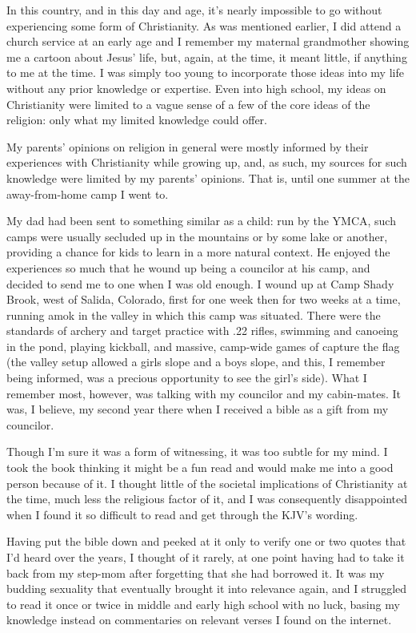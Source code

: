 \documentclass{book}
\begin{document}
In this country, and in this day and age, it's nearly impossible to go without experiencing some form of Christianity.  As was mentioned earlier, I did attend a church service at an early age and I remember my maternal grandmother showing me a cartoon about Jesus' life, but, again, at the time, it meant little, if anything to me at the time.  I was simply too young to incorporate those ideas into my life without any prior knowledge or expertise.  Even into high school, my ideas on Christianity were limited to a vague sense of a few of the core ideas of the religion: only what my limited knowledge could offer.

My parents' opinions on religion in general were mostly informed by their experiences with Christianity while growing up, and, as such, my sources for such knowledge were limited by my parents' opinions.  That is, until one summer at the away-from-home camp I went to.

My dad had been sent to something similar as a child: run by the YMCA, such camps were usually secluded up in the mountains or by some lake or another, providing a chance for kids to learn in a more natural context.  He enjoyed the experiences so much that he wound up being a councilor at his camp, and decided to send me to one when I was old enough.  I wound up at Camp Shady Brook, west of Salida, Colorado, first for one week then for two weeks at a time, running amok in the valley in which this camp was situated.  There were the standards of archery and target practice with .22 rifles, swimming and canoeing in the pond, playing kickball, and massive, camp-wide games of capture the flag (the valley setup allowed a girls slope and a boys slope, and this, I remember being informed, was a precious opportunity to see the girl's side).  What I remember most, however, was talking with my councilor and my cabin-mates.  It was, I believe, my second year there when I received a bible as a gift from my councilor.

Though I'm sure it was a form of witnessing, it was too subtle for my mind.  I took the book thinking it might be a fun read and would make me into a good person because of it.  I thought little of the societal implications of Christianity at the time, much less the religious factor of it, and I was consequently disappointed when I found it so difficult to read and get through the KJV's wording.

Having put the bible down and peeked at it only to verify one or two quotes that I'd heard over the years, I thought of it rarely, at one point having had to take it back from my step-mom after forgetting that she had borrowed it.  It was my budding sexuality that eventually brought it into relevance again, and I struggled to read it once or twice in middle and early high school with no luck, basing my knowledge instead on commentaries on relevant verses I found on the internet.
\end{document}
